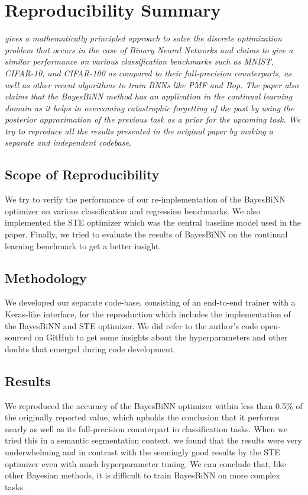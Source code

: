 \section*{\centering Reproducibility Summary}

\textit{\cite{r1} gives a mathematically principled approach to solve the discrete optimization problem that occurs in the case of Binary Neural Networks and claims to give a similar performance on various classification benchmarks such as MNIST, CIFAR-10, and CIFAR-100 as compared to their full-precision counterparts, as well as other recent algorithms to train BNNs like PMF and Bop. The paper also claims that the BayesBiNN method has an application in the continual learning domain as it helps in overcoming catastrophic forgetting of the past by using the posterior approximation of the previous task as a prior for the upcoming task. We try to reproduce all the results presented in the original paper by making a separate and independent codebase.
}

\subsection*{Scope of Reproducibility}

We try to verify the performance of our re-implementation of the BayesBiNN optimizer on various classification and regression benchmarks. We also implemented the STE optimizer which was the central baseline model used in the paper. Finally, we tried to evaluate the results of BayesBiNN on the continual learning benchmark to get a better insight.

\subsection*{Methodology}

We developed our separate code-base, consisting of an end-to-end trainer with a Keras-like interface, for the reproduction which includes the implementation of the BayesBiNN and STE optimizer. We did refer to the author's code open-sourced on GitHub to get some insights about the hyperparameters and other doubts that emerged during code development.

\subsection*{Results}

We reproduced the accuracy of the BayesBiNN optimizer within less than 0.5\% of the originally reported value, which upholds the conclusion that it performs nearly as well as its full-precision counterpart in classification tasks. When we tried this in a semantic segmentation context, we found that the results were very underwhelming and in contrast with the seemingly good results by the STE optimizer even with much hyperparameter tuning. We can conclude that, like other Bayesian methods, it is difficult to train BayesBiNN on more complex tasks.

